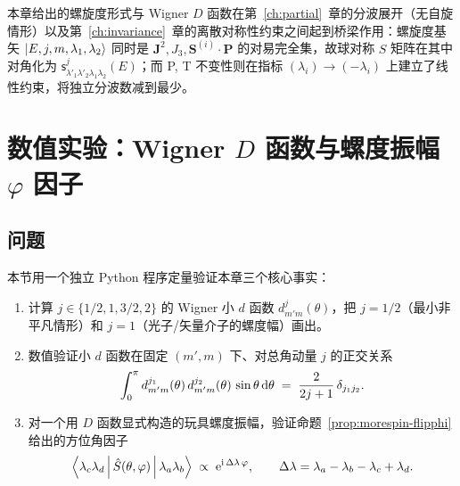 \begin{remark}
本章给出的螺旋度形式与 Wigner $D$ 函数在第~\ref{ch:partial}~章的分波展开（无自旋情形）以及第~\ref{ch:invariance}~章的离散对称性约束之间起到桥梁作用：螺旋度基矢 $\ket{E,j,m,\lambda_1,\lambda_2}$ 同时是 $\bm J^2,J_3,\bm S^{(i)}\!\cdot\hat{\bm P}$ 的对易完全集，故球对称 $S$ 矩阵在其中对角化为 $\mathsf s^j_{\lambda'_1\lambda'_2\lambda_1\lambda_2}(E)$；而 P, T 不变性则在指标 $(\lambda_i)\to(-\lambda_i)$ 上建立了线性约束，将独立分波数减到最少。
\end{remark}

\section{数值实验：Wigner $D$ 函数与螺度振幅 $\varphi$ 因子}\label{sec:numexp-ch06}

\subsection*{问题}
本节用一个独立 Python 程序定量验证本章三个核心事实：
\begin{enumerate}
    \item[(a)] 计算 $j\in\{1/2,1,3/2,2\}$ 的 Wigner 小 $d$ 函数 $d^j_{m'm}(\theta)$，把 $j=1/2$（最小非平凡情形）和 $j=1$（光子/矢量介子的螺度幅）画出。
    \item[(b)] 数值验证小 $d$ 函数在固定 $(m',m)$ 下、对总角动量 $j$ 的正交关系
    \[
        \int_0^\pi d^{j_1}_{m'm}(\theta)\,d^{j_2}_{m'm}(\theta)\,\sin\theta\,\mathrm{d}\theta
        \;=\;\frac{2}{2j+1}\,\delta_{j_1 j_2}.
    \]
    \item[(c)] 对一个用 $D$ 函数显式构造的玩具螺度振幅，验证命题~\ref{prop:morespin-flipphi} 给出的方位角因子
    \[
        \left\langle \lambda_c\lambda_d \,\middle|\, \hat S(\theta,\varphi) \,\middle|\, \lambda_a\lambda_b \right\rangle
        \;\propto\;\mathrm{e}^{\mathrm{i}\,\Delta\lambda\,\varphi},\qquad
        \Delta\lambda=\lambda_a-\lambda_b-\lambda_c+\lambda_d.
    \]
\end{enumerate}

